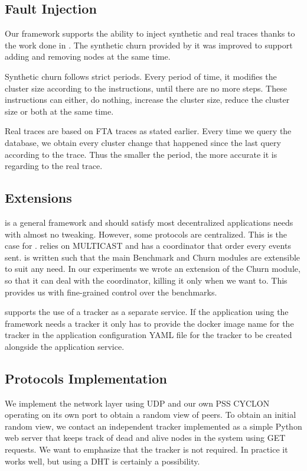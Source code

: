 \subsection{Fault Injection}
Our framework supports the ability to inject synthetic and real traces thanks to the work done in \autocite{vaucher2016erasure}. The synthetic churn provided by it was improved to support adding and removing nodes at the same time.

Synthetic churn follows strict periods. Every period of time, it modifies the cluster size according to the instructions, until there are no more steps. These instructions can either, do nothing, increase the cluster size, reduce the cluster size or both at the same time.

Real traces are based on FTA traces as stated earlier. Every time we query the database, we obtain every cluster change that happened since the last query according to the trace. Thus the smaller the period, the more accurate it is regarding to the real trace.
\subsection{Extensions}
\eptotester is a general framework and should satisfy most decentralized applications needs with almost no tweaking. However, some protocols are centralized. This is the case for \jgroups. \jgroups relies on MULTICAST and has a coordinator that order every events sent. \eptotester is written such that the main Benchmark and Churn modules are extensible to suit any need. In our experiments we wrote an extension of the Churn module, so that it can deal with the coordinator, killing it only when we want to. This provides us with fine-grained control over the benchmarks. 

\eptotester supports the use of a tracker as a separate service. If the application using the framework needs a tracker it only has to provide the docker image name for the tracker in the application configuration YAML file for the tracker to be created alongside the application service.
\subsection{Protocols Implementation}
We implement the network layer using UDP and our own PSS CYCLON operating on its own port to obtain a random view of peers. To obtain an initial random view, we contact an independent tracker implemented as a simple Python web server that keeps track of dead and alive nodes in the system using GET requests. We want to emphasize that the tracker is not required. In practice it works well, but using a DHT is certainly a possibility.


